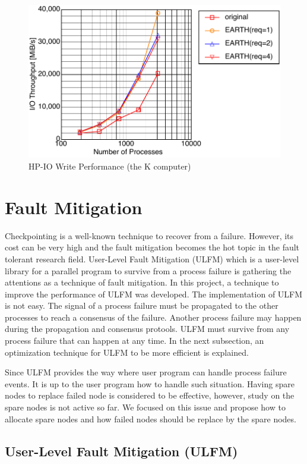 \begin{figure}[ht]
\begin{center}
\includegraphics[width=0.8\columnwidth]{Figs/K-HPIO.pdf}
  \caption{HP-IO Write Performance (the K computer)}
  \label{fig:earth}
\end{center}
\end{figure}

\section{Fault Mitigation}

Checkpointing is a well-known technique to recover from a
failure. However, its cost can be very high and the fault mitigation
becomes the hot topic in the fault tolerant research field. User-Level
Fault Mitigation (ULFM) which is a user-level 
library for a parallel program to survive from a process failure is
gathering the attentions as a technique of fault mitigation. In this
project, a technique to improve the performance of ULFM was developed.
The implementation of ULFM is not easy. The signal of a process
failure must be propagated to the other processes to reach a consensus
of the failure. Another process failure may happen during the
propagation and consensus protools. ULFM must survive from any
process failure that can happen at any time. In the next subsection,
an optimization technique for ULFM to be more efficient is explained. 

Since ULFM provides the way where user program can handle process
failure events. It is up to the user program how to handle such
situation. Having spare nodes to replace failed node is considered to
be effective, however, study on the spare nodes is not active so far. We
focused on this issue and propose how to allocate spare nodes and how
failed nodes should be replace by the spare nodes. 

\subsection{User-Level Fault Mitigation (ULFM)}

